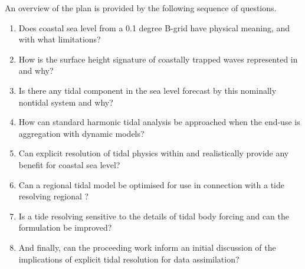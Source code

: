 An overview of the plan is provided by the following sequence of questions.   
\BoxBegin
\begin{enumerate}
\item Does coastal sea level from a 0.1 degree B-grid \OGCM{} have physical meaning, and with what limitations? 
	\par[pg \pageref{S:plan_whichcell}]
\item How is the surface height signature of coastally trapped waves represented in \BL{} and why? 
	\par[pg \pageref{S:plan_CTW}]
\item Is there any tidal component in the sea level forecast by this nominally nontidal system and why?
	\par[pg \pageref{S:plan_nontidal_tidal}]
\item How can standard harmonic tidal analysis be approached when the end-use is aggregation with dynamic models?
	\par[pg \pageref{S:plan_insitu_analysis}]
\item Can explicit resolution of tidal physics within and \OGCM{} realistically provide any benefit for coastal sea level?
	\par[pg \pageref{S:plan_OFAMR}]
\item Can a regional tidal model be optimised for use in connection with a tide resolving regional \OGCM{}?
	\par[pg \pageref{S:plan_OTIS}]
\item Is a tide resolving \OGCM{} sensitive to the details of tidal body forcing and can the formulation be improved?
	\par[pg \pageref{S:plan_bodyforcing}]
\item And finally, can the proceeding work inform an initial discussion of the implications of explicit tidal resolution for data assimilation?
	\par[pg \pageref{S:plan_DA}]
\end{enumerate}
\BoxEnd





























